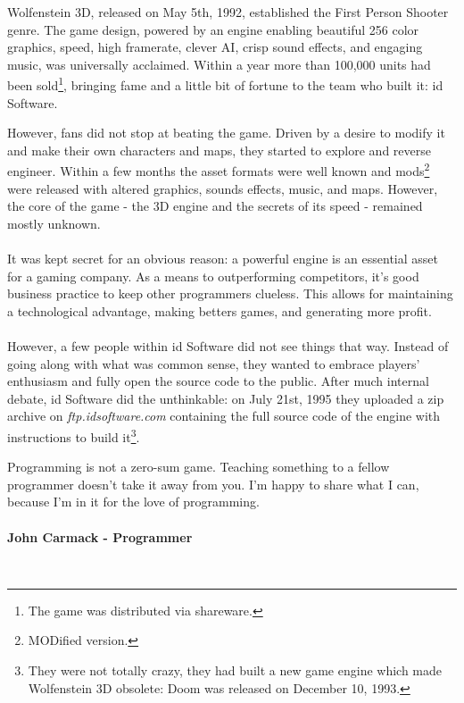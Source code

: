 Wolfenstein 3D, released on May 5th, 1992, established the First Person Shooter genre. The game design, powered by an engine enabling beautiful 256 color graphics, speed, high framerate, clever AI, crisp sound effects, and engaging music, was universally acclaimed. Within a year more than 100,000 units had been sold\footnote{The game was distributed via shareware.}, bringing fame and a little bit of fortune to the team who built it: id Software.\\
\par
\begin{figure}[H]
\centering
{}
\end{figure}
\par
However, fans did not stop at beating the game. Driven by a desire to modify it and make their own characters and maps, they started to explore and reverse engineer. Within a few months the asset formats were well known and  mods\footnote{MODified version.} were released with altered graphics, sounds effects, music, and maps. However, the core of the game - the 3D engine and the secrets of its speed - remained mostly unknown.\\
\\
It was kept secret for an obvious reason: a powerful engine is an essential asset for a gaming company. As a means to outperforming competitors, it's good business practice to keep other programmers clueless. This allows for maintaining a technological advantage, making betters games, and generating more profit.\\
\\
However, a few people within id Software did not see things that way. Instead of going along with what was common sense, they wanted to embrace players' enthusiasm and fully open the source code to the public. After much internal debate, id Software did the unthinkable: on July 21st, 1995 they uploaded a zip archive on \emph{ftp.idsoftware.com} containing the full source code of the engine with instructions to build it\footnote{They were not totally crazy, they had built a new game engine which made Wolfenstein 3D obsolete: Doom was released on December 10, 1993.}.\\
\par
 \begin{fancyquotes}
   Programming is not a zero-sum game. Teaching something to a fellow programmer doesn't take it away from you. I'm happy to share what I can, because I'm in it for the love of programming.\\
   \\
\textbf{John Carmack - Programmer}
 \end{fancyquotes}\\
